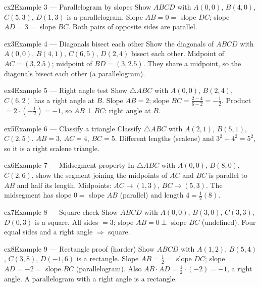 \documentclass[11pt]{article}
\begin{document}
\begin{example}{ex2}{Example 3 --- Parallelogram by slopes}
Show $ABCD$ with $A(0,0)$, $B(4,0)$, $C(5,3)$, $D(1,3)$ is a parallelogram.
\soln Slope $AB=0=$ slope $DC$; slope $AD=3=$ slope $BC$. Both pairs of opposite sides are parallel.
\end{example}

\begin{example}{ex3}{Example 4 --- Diagonals bisect each other}
Show the diagonals of $ABCD$ with $A(0,0)$, $B(4,1)$, $C(6,5)$, $D(2,4)$ bisect each other.
\soln Midpoint of $AC=(3,2.5)$; midpoint of $BD=(3,2.5)$. They share a midpoint, so the diagonals bisect each other (a parallelogram).
\end{example}

\begin{example}{ex4}{Example 5 --- Right angle test}
Show $\triangle ABC$ with $A(0,0)$, $B(2,4)$, $C(6,2)$ has a right angle at $B$.
\soln Slope $AB=2$; slope $BC=\tfrac{2-4}{6-2}=-\tfrac12$. Product $=2\cdot(-\tfrac12)=-1$, so $AB\perp BC$: right angle at $B$.
\end{example}

\begin{example}{ex5}{Example 6 --- Classify a triangle}
Classify $\triangle ABC$ with $A(2,1)$, $B(5,1)$, $C(2,5)$.
\soln $AB=3$, $AC=4$, $BC=5$. Different lengths (scalene) and $3^2+4^2=5^2$, so it is a right scalene triangle.
\end{example}

\begin{example}{ex6}{Example 7 --- Midsegment property}
In $\triangle ABC$ with $A(0,0)$, $B(8,0)$, $C(2,6)$, show the segment joining the midpoints of $AC$ and $BC$ is parallel to $AB$ and half its length.
\soln Midpoints: $AC\to(1,3)$, $BC\to(5,3)$. The midsegment has slope $0=$ slope $AB$ (parallel) and length $4=\tfrac12(8)$.
\end{example}

\begin{example}{ex7}{Example 8 --- Square check}
Show $ABCD$ with $A(0,0)$, $B(3,0)$, $C(3,3)$, $D(0,3)$ is a square.
\soln All sides $=3$; slope $AB=0\perp$ slope $BC$ (undefined). Four equal sides and a right angle $\Rightarrow$ square.
\end{example}

\begin{example}{ex8}{Example 9 --- Rectangle proof (harder)}
Show $ABCD$ with $A(1,2)$, $B(5,4)$, $C(3,8)$, $D(-1,6)$ is a rectangle.
\soln Slope $AB=\tfrac12=$ slope $DC$; slope $AD=-2=$ slope $BC$ (parallelogram). Also $AB\cdot AD=\tfrac12\cdot(-2)=-1$, a right angle. A parallelogram with a right angle is a rectangle.
\end{example}
\end{document}
